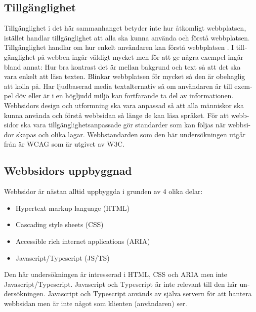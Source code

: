 \documentclass[11p]{article}
\begin{document}
\begin{otherlanguage}{swedish}
    \subsection{Tillgänglighet}
    Tillgänglighet i det här sammanhanget betyder inte hur åtkomligt webbplatsen, istället handlar tillgänglighet att alla ska kunna använda och förstå webbplatsen. %
    Tillgänglighet handlar om hur enkelt användaren kan förstå webbplatsen \parencite{webbriktlinjer}.
    I tillgänglighet på webben ingår väldigt mycket men för att ge några exempel ingår bland annat:
    Hur bra kontrast det är mellan bakgrund och text så att det ska vara enkelt att läsa texten.
    Blinkar webbplatsen för mycket så den är obehaglig att kolla på.
    Har ljudbaserad media textalternativ så om användaren är till exempel döv eller är i en högljudd miljö kan fortfarande ta del av informationen.
    \\Webbsidors design och utformning ska vara anpassad så att alla människor ska kunna använda och förstå webbsidan så länge de kan läsa språket.
    För att webbsidor ska vara tillgänglighetsanpassade gör standarder som kan följas när webbsidor skapas och olika lagar.
    Webbstandarden som den här undersökningen utgår från är WCAG som är utgivet av W3C.


    \subsection{Webbsidors uppbyggnad}
    Webbsidor är nästan alltid uppbyggda i grunden av 4 olika delar: %
    \begin{itemize}
        \item Hypertext markup language (HTML)
        \item Cascading style sheets (CSS)
        \item Accessible rich internet applications (ARIA)
        \item Javascript/Typescript (JS/TS)
    \end{itemize}
    Den här undersökningen är intresserad i HTML, CSS och ARIA men inte Javascript/Typescript.
    Javascript och Typescript är inte relevant till den här undersökningen.
    Javascript och Typescript används av själva servern för att hantera webbsidan men är inte något som klienten (användaren) ser. %


\end{otherlanguage}
\end{document}
